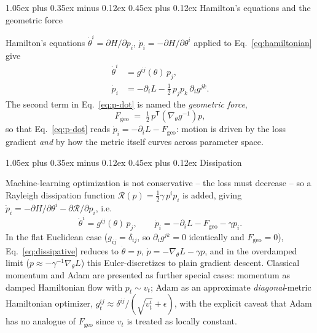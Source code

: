 \documentclass[10pt,twocolumn]{article}
\makeatletter
\renewcommand\subsection{\@startsection{subsection}{2}{0pt}%
  {1.05ex plus 0.35ex minus 0.12ex}%
  {0.45ex plus 0.12ex}%
  {\normalsize\bfseries}}
\makeatother
\begin{document}
\subsection{Hamilton's equations and the geometric force}

Hamilton's equations $\dot\theta^i = \partial H/\partial p_i$,
$\dot p_i = -\partial H/\partial\theta^i$ applied to
Eq.~\eqref{eq:hamiltonian} give
\begin{align}
\dot\theta^i &= g^{ij}(\theta)\, p_j, \label{eq:theta-dot}\\
\dot p_i &= -\partial_i L - \tfrac{1}{2}\, p_j p_k\, \partial_i g^{jk}.
\label{eq:p-dot}
\end{align}
The second term in Eq.~\eqref{eq:p-dot} is named the \emph{geometric force},
\begin{equation}
F_{\mathrm{geo}} \;=\; \tfrac{1}{2}\, p^{\mathsf T}\!\left(\nabla_\theta g^{-1}\right) p,
\label{eq:fgeo}
\end{equation}
so that Eq.~\eqref{eq:p-dot} reads $\dot p_i = -\partial_i L - F_{\mathrm{geo}}$:
motion is driven by the loss gradient \emph{and} by how the metric itself
curves across parameter space.

\subsection{Dissipation}

Machine-learning optimization is not conservative -- the loss must decrease --
so a Rayleigh dissipation function $\mathcal R(p) = \tfrac12 \gamma\, p^i p_i$
is added, giving $\dot p_i = -\partial H/\partial\theta^i - \partial\mathcal
R/\partial p_i$, i.e.
\begin{equation}
\dot\theta^i = g^{ij}(\theta)\,p_j, \qquad
\dot p_i = -\partial_i L - F_{\mathrm{geo}} - \gamma p_i.
\label{eq:dissipative}
\end{equation}
In the flat Euclidean case ($g_{ij}=\delta_{ij}$, so $\partial_i g^{jk}=0$
identically and $F_{\mathrm{geo}}=0$), Eq.~\eqref{eq:dissipative} reduces to
$\dot\theta = p$, $\dot p = -\nabla_\theta L - \gamma p$, and in the overdamped
limit ($p \approx -\gamma^{-1}\nabla_\theta L$) this Euler-discretizes to plain
gradient descent. Classical momentum and Adam are presented as further special
cases: momentum as damped Hamiltonian flow with $p_t \sim v_t$; Adam as an
approximate \emph{diagonal}-metric Hamiltonian optimizer,
$g_t^{ij} \approx \delta^{ij}/(\sqrt{v_t^i}+\epsilon)$, with the explicit
caveat that Adam has no analogue of $F_{\mathrm{geo}}$ since $v_t$ is treated
as locally constant.
\end{document}

